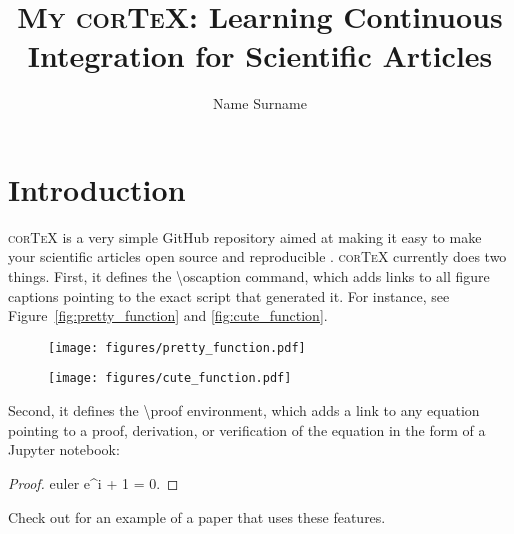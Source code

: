 \documentclass[modern]{aastex62}
\begin{document}
\title{\textsc{My corTeX}: Learning Continuous Integration for Scientific Articles}

\author[0000-0000-0000-0000]{Name Surname}


\section{Introduction}
\label{sec:intro}
%
\textsc{corTeX} is a very simple \textsf{GitHub} repository aimed at making
it easy to make your scientific articles open source and reproducible \citet{Luger2018}.
\textsc{corTeX} currently does two things. First, it defines the
\textsf{\textbackslash oscaption} command, which adds
links to all figure captions pointing to the exact script that generated it.
For instance, see Figure~\ref{fig:pretty_function} and \ref{fig:cute_function}.
%
\begin{figure}[h!]
    \begin{centering}
    \texttt{[image: figures/pretty\_function.pdf]}
    \end{centering}
\end{figure}

%
\begin{figure}[h!]
    \begin{centering}
    \texttt{[image: figures/cute\_function.pdf]}
    \end{centering}
\end{figure}



Second, it defines the \textsf{\textbackslash proof} environment, which
adds a link to any equation pointing to a proof, derivation, or
verification of the equation in the form of a \textsf{Jupyter} notebook:
\begin{proof}{euler}
    \label{eq:euler}
    e^{i\pi} + 1 = 0.
\end{proof}
Check out \citet{Luger2018} for an example of a paper that uses these
features.

\pagebreak

\end{document}

